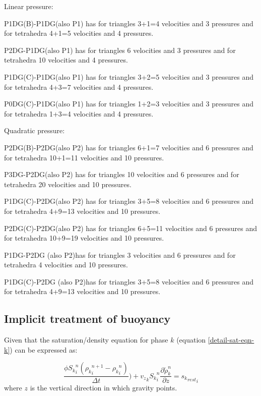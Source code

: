 \noindent
\noindent
Linear pressure:

\noindent
P1DG(B)-P1DG(also P1) has for triangles 3+1=4 velocities and 3 pressures and
for tetrahedra 4+1=5 velocities and 4 pressures.

\noindent
P2DG-P1DG(also P1) has for triangles 6 velocities and 3 pressures and
for tetrahedra 10 velocities and 4 pressures.

\noindent
P1DG(C)-P1DG(also P1) has for triangles 3+2=5 velocities and 3 pressures and
for tetrahedra 4+3=7 velocities and 4 pressures.

\noindent
P0DG(C)-P1DG(also P1) has for triangles 1+2=3 velocities and 3 pressures and
for tetrahedra 1+3=4 velocities and 4 pressures.


\noindent
\noindent
Quadratic pressure:

\noindent
P2DG(B)-P2DG(also P2) has for triangles 6+1=7 velocities and 6 pressures and
for tetrahedra 10+1=11 velocities and 10 pressures.

\noindent
P3DG-P2DG(also P2) has for triangles 10 velocities and 6 pressures and
for tetrahedra 20 velocities and 10 pressures.

\noindent
P1DG(C)-P2DG(also P2) has for triangles 3+5=8 velocities and 6 pressures and
for tetrahedra 4+9=13 velocities and 10 pressures.

\noindent
P2DG(C)-P2DG(also P2) has for triangles 6+5=11 velocities and 6 pressures and
for tetrahedra 10+9=19 velocities and 10 pressures.

\noindent
P1DG-P2DG (also P2)has for triangles 3 velocities and 6 pressures and
for tetrahedra 4 velocities and 10 pressures.

\noindent
P1DG(C)-P2DG (also P2)has for triangles 3+5=8 velocities and 6 pressures and
for tetrahedra 4+9=13 velocities and 10 pressures.




\subsection{Implicit treatment of buoyancy}
Given that the saturation/density equation for phase
$k$ (equation \ref{detail-sat-eqn-k}) can be expressed as:

\begin{equation}
 \frac{\phi{S_k}_i^n( {\rho_k}_i^{n+1}-{\rho_k}_i^n)} {\Delta t} )
 + {v_z}_k {S_k}_i^n \frac{\partial \tilde \rho_k^n }{ \partial z}
= {{s_k}_{rest}}_i
\label{sat-part}
\end{equation}
where $z$ is the vertical direction in which gravity points.


